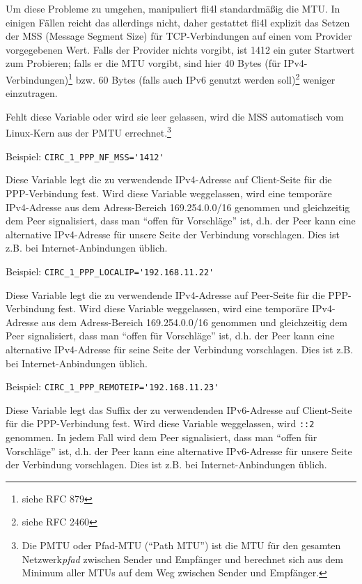 \begin{description}
Um diese Probleme zu umgehen, manipuliert fli4l standardmäßig die MTU. In
einigen Fällen reicht das allerdings nicht, daher gestattet fli4l explizit das
Setzen der MSS (Message Segment Size) für TCP-Verbindungen auf einen vom
Provider vorgegebenen Wert. Falls der Provider nichts vorgibt, ist 1412 ein
guter Startwert zum Probieren; falls er die MTU vorgibt, sind hier 40 Bytes
(für IPv4-Verbindungen)\footnote{siehe RFC 879} bzw. 60 Bytes (falls auch IPv6
genutzt werden soll)\footnote{siehe RFC 2460} weniger einzutragen.

Fehlt diese Variable oder wird sie leer gelassen, wird die MSS automatisch
vom Linux-Kern aus der PMTU errechnet.\footnote{Die PMTU oder Pfad-MTU
(``Path MTU'') ist die MTU für den gesamten Netzwerk\emph{pfad} zwischen Sender
und Empfänger und berechnet sich aus dem Minimum aller MTUs auf dem Weg zwischen
Sender und Empfänger.}

Beispiel: \verb+CIRC_1_PPP_NF_MSS='1412'+


Diese Variable legt die zu verwendende IPv4-Adresse auf Client-Seite für die
PPP-Verbindung fest. Wird diese Variable weggelassen, wird eine temporäre
IPv4-Adresse aus dem Adress-Bereich 169.254.0.0/16 genommen und gleichzeitig
dem Peer signalisiert, dass man ``offen für Vorschläge'' ist, d.h. der Peer kann
eine alternative IPv4-Adresse für unsere Seite der Verbindung vorschlagen. Dies
ist z.B. bei Internet-Anbindungen üblich.

Beispiel: \verb+CIRC_1_PPP_LOCALIP='192.168.11.22'+


Diese Variable legt die zu verwendende IPv4-Adresse auf Peer-Seite für die
PPP-Verbindung fest. Wird diese Variable weggelassen, wird eine temporäre
IPv4-Adresse aus dem Adress-Bereich 169.254.0.0/16 genommen und gleichzeitig
dem Peer signalisiert, dass man ``offen für Vorschläge'' ist, d.h. der Peer kann
eine alternative IPv4-Adresse für seine Seite der Verbindung vorschlagen. Dies
ist z.B. bei Internet-Anbindungen üblich.

Beispiel: \verb+CIRC_1_PPP_REMOTEIP='192.168.11.23'+


Diese Variable legt das Suffix der zu verwendenden IPv6-Adresse auf
Client-Seite für die PPP-Verbindung fest. Wird diese Variable weggelassen,
wird \verb+::2+ genommen. In jedem Fall wird dem Peer signalisiert, dass man
``offen für Vorschläge'' ist, d.h. der Peer kann eine alternative IPv6-Adresse
für unsere Seite der Verbindung vorschlagen. Dies ist z.B. bei
Internet-Anbindungen üblich.


\end{description}
